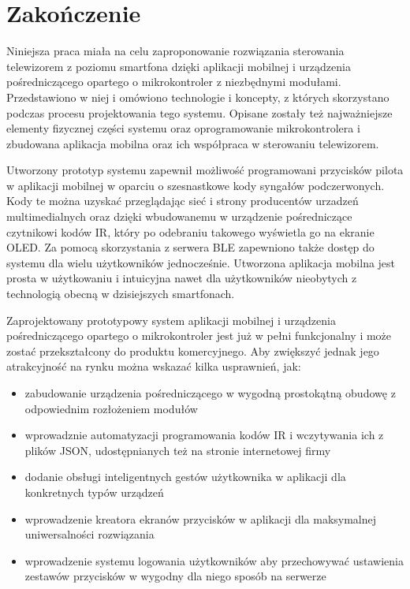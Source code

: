 \documentclass[12pt,twoside,draft]{article}
\begin{document}
\clearpage

\section{Zakończenie}

Niniejsza praca miała na celu zaproponowanie rozwiązania sterowania telewizorem z poziomu smartfona dzięki aplikacji mobilnej i urządzenia pośredniczącego opartego o mikrokontroler z niezbędnymi modułami. Przedstawiono w niej i omówiono technologie i koncepty, z których skorzystano podczas procesu projektowania tego systemu. Opisane zostały też najważniejsze elementy fizycznej części systemu oraz oprogramowanie mikrokontrolera i zbudowana aplikacja mobilna oraz ich współpraca w sterowaniu telewizorem.

Utworzony prototyp systemu zapewnił możliwość programowani przycisków pilota w aplikacji mobilnej w oparciu o szesnastkowe kody syngałów podczerwonych. Kody te można uzyskać przeglądając sieć i strony producentów urzadzeń multimedialnych oraz dzięki wbudowanemu w urządzenie pośredniczące czytnikowi kodów IR, który po odebraniu takowego wyświetla go na ekranie OLED. Za pomocą skorzystania z serwera BLE zapewniono także dostęp do systemu dla wielu użytkowników jednocześnie. Utworzona aplikacja mobilna jest prosta w użytkowaniu i intuicyjna nawet dla użytkowników nieobytych z technologią obecną w dzisiejszych smartfonach.

Zaprojektowany prototypowy system aplikacji mobilnej i urządzenia pośredniczącego opartego o mikrokontroler jest już w pełni funkcjonalny i może zostać przekształcony do produktu komercyjnego. Aby zwiększyć jednak jego atrakcyjność na rynku można wskazać kilka usprawnień, jak:
\begin{itemize}[label=-,labelsep=0.4cm,leftmargin=0.65cm]
   \item zabudowanie urządzenia pośredniczącego w wygodną prostokątną obudowę z odpowiednim rozłożeniem modułów
   \item wprowadznie automatyzacji programowania kodów IR i wczytywania ich z plików JSON, udostępnianych też na stronie internetowej firmy
   \item dodanie obsługi inteligentnych gestów użytkownika w aplikacji dla konkretnych typów urządzeń
   \item wprowadzenie kreatora ekranów przycisków w aplikacji dla maksymalnej uniwersalności rozwiązania
   \item wprowadzenie systemu logowania użytkowników aby przechowywać ustawienia zestawów przycisków w wygodny dla niego sposób na serwerze
   
\end{itemize}
\end{document}
